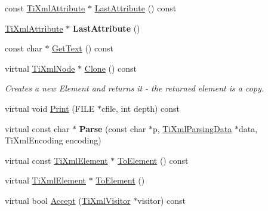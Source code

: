 \begin{DoxyCompactItemize}
\item 
const \hyperlink{class_ti_xml_attribute}{\-Ti\-Xml\-Attribute} $\ast$ \hyperlink{class_ti_xml_element_a86191b49f9177be132b85b14655f1381}{\-Last\-Attribute} () const 
\item 
\hypertarget{class_ti_xml_element_a222f81cf06155cd108f2a68d4d176004}{
\hyperlink{class_ti_xml_attribute}{\-Ti\-Xml\-Attribute} $\ast$ {\bfseries \-Last\-Attribute} ()}
\label{class_ti_xml_element_a222f81cf06155cd108f2a68d4d176004}

\item 
const char $\ast$ \hyperlink{class_ti_xml_element_aa6dedd8a146acf3b1bc0903deb2d411a}{\-Get\-Text} () const 
\item 
\hypertarget{class_ti_xml_element_a13f6df105ebb1e8dc636e75cc883be32}{
virtual \hyperlink{class_ti_xml_node}{\-Ti\-Xml\-Node} $\ast$ \hyperlink{class_ti_xml_element_a13f6df105ebb1e8dc636e75cc883be32}{\-Clone} () const }
\label{class_ti_xml_element_a13f6df105ebb1e8dc636e75cc883be32}

\begin{DoxyCompactList}\small\item\em \-Creates a new \-Element and returns it -\/ the returned element is a copy. \end{DoxyCompactList}\item 
virtual void \hyperlink{class_ti_xml_element_ad9d0c008866982ab8d9aafae7e14d692}{\-Print} (\-F\-I\-L\-E $\ast$cfile, int depth) const 
\item 
\hypertarget{class_ti_xml_element_af95c9165159fd9dfdcc5b894a3fcf85b}{
virtual const char $\ast$ {\bfseries \-Parse} (const char $\ast$p, \hyperlink{class_ti_xml_parsing_data}{\-Ti\-Xml\-Parsing\-Data} $\ast$data, \-Ti\-Xml\-Encoding encoding)}
\label{class_ti_xml_element_af95c9165159fd9dfdcc5b894a3fcf85b}

\item 
virtual const \hyperlink{class_ti_xml_element}{\-Ti\-Xml\-Element} $\ast$ \hyperlink{class_ti_xml_element_ac5b8d0e25fa23fd9acbb6d146082901c}{\-To\-Element} () const 
\item 
virtual \hyperlink{class_ti_xml_element}{\-Ti\-Xml\-Element} $\ast$ \hyperlink{class_ti_xml_element_a9def86337ea7a755eb41cac980f60c7a}{\-To\-Element} ()
\item 
virtual bool \hyperlink{class_ti_xml_element_a31ab28cc3b892a69254391d6bbe08df3}{\-Accept} (\hyperlink{class_ti_xml_visitor}{\-Ti\-Xml\-Visitor} $\ast$visitor) const 
\end{DoxyCompactItemize}
